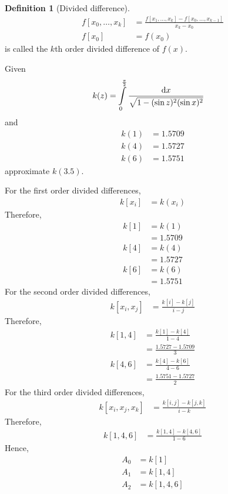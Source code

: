 \documentclass[fleqn, a4paper, 12pt, twoside, titlepage]{article}
\theoremstyle{definition}
\newtheorem{definition}{Definition}
\theoremstyle{theorem}
\begin{document}
\begin{definition}[Divided difference]
	\begin{align*}
		f[x_0,\dots,x_k] & = \frac{f[x_1,\dots,x_k] - f[x_0,\dots,x_{k - 1}]}{x_k - x_0} \\
		f[x_0]           & = f(x_0)
	\end{align*}
	is called the $k$th order divided difference of $f(x)$.
\end{definition}

\begin{question}
	Given
	\begin{align*}
		k(z) & = \int\limits_{0}^{\frac{\pi}{2}} \frac{\dif x}{\sqrt{1 - (\sin z)^2 (\sin x)^2}}
	\end{align*}
	and
	\begin{align*}
		k(1) & = 1.5709 \\
		k(4) & = 1.5727 \\
		k(6) & = 1.5751
	\end{align*}
	approximate $k(3.5)$.
\end{question}

\begin{solution}
	For the first order divided differences,
	\begin{align*}
		k[x_i] & = k(x_i)
	\end{align*}
	Therefore,
	\begin{align*}
		k[1] & = k(1)   \\
                     & = 1.5709 \\
		k[4] & = k(4)   \\
                     & = 1.5727 \\
		k[6] & = k(6)   \\
                     & = 1.5751
	\end{align*}
	For the second order divided differences,
	\begin{align*}
		k[x_i,x_j] & = \frac{k[i] - k[j]}{i - j}
	\end{align*}
	Therefore,
	\begin{align*}
		k[1,4] & = \frac{k[1] - k[4]}{1 - 4} \\
                       & = \frac{1.5727 - 1.5709}{3} \\
		k[4,6] & = \frac{k[4] - k[6]}{4 - 6} \\
                       & = \frac{1.5751 - 1.5727}{2}
	\end{align*}
	For the third order divided differences,
	\begin{align*}
		k[x_i,x_j,x_k] & = \frac{k[i,j] - k[j,k]}{i - k}
	\end{align*}
	Therefore,
	\begin{align*}
		k[1,4,6] & = \frac{k[1,4] - k[4,6]}{1 - 6}
	\end{align*}
	Hence,
	\begin{align*}
		A_0 & = k[1]   \\
		A_1 & = k[1,4] \\
		A_2 & = k[1,4,6]
	\end{align*}
\end{solution}
\end{document}
